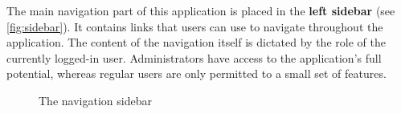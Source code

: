 \documentclass[FM,BP,EN,fonts]{tulthesis}
\begin{document}
The main navigation part of this application is placed in the \textbf{left sidebar} (see \autoref{fig:sidebar}). It contains links that users can use to navigate throughout the application. The content of the navigation itself is dictated by the role of the currently logged-in user. Administrators have access to the application's full potential, whereas regular users are only permitted to a small set of features.

\begin{figure}[H]
    \centering
    \caption{The navigation sidebar}
    \label{fig:sidebar}
\end{figure}
\end{document}
